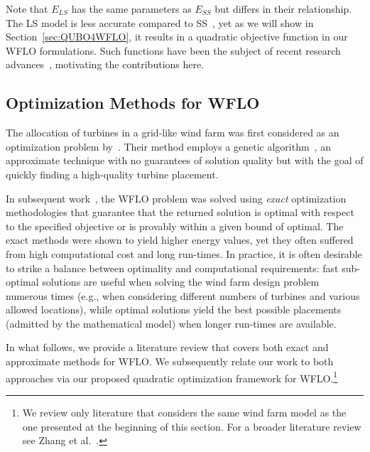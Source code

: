\documentclass[preprint,12pt]{elsarticle}
\newcommand{\todo}[1]{{\textcolor{red}{\bf {#1}}}}
\begin{document}
Note that $E_{LS}$ has the same parameters as $E_{SS}$ but differs in their relationship.
The LS model is less accurate compared to SS~\cite{Zhang2014}, yet as we will show in Section~\ref{sec:QUBO4WFLO}, it 
 results in a quadratic objective function in our WFLO formulations. Such functions have been the subject of recent research advances~\cite{ku2017hybrid,bian2010ising}, motivating the contributions here.
 

\subsection{Optimization Methods for WFLO}

The allocation of turbines in a grid-like wind farm was first
considered as an optimization problem by~\citet{MOSETTI1994105}. Their
method employs a genetic
algorithm~\cite{davis1991handbook}, an approximate technique
with no guarantees of solution quality but with the goal of quickly finding a high-quality turbine placement.


In subsequent work~\cite{turner2014new,Zhang2014}, 
the WFLO problem was solved using \emph{exact}  
optimization methodologies that guarantee that the returned solution is optimal with respect
to the specified objective or is provably within a given bound of optimal.
The exact methods were shown to yield higher energy values, yet they often suffered from 
high computational cost and long run-times. In practice, it is often desirable to strike a balance between optimality and computational requirements: fast sub-optimal solutions are useful when solving the wind farm design problem numerous times (e.g., when considering different numbers of turbines and various allowed locations), while optimal solutions yield the best possible placements (admitted by the mathematical model) when longer run-times are available.

In what follows, we provide a literature review that covers both exact and approximate methods for WFLO. We subsequently relate our 
work to both approaches via our proposed quadratic optimization framework for WFLO.\footnote{We review 
only literature that considers the same wind farm model as the one presented at the beginning of this section. For a broader literature review see Zhang et al.\ \cite{Zhang2014}.} 
 
\end{document}
